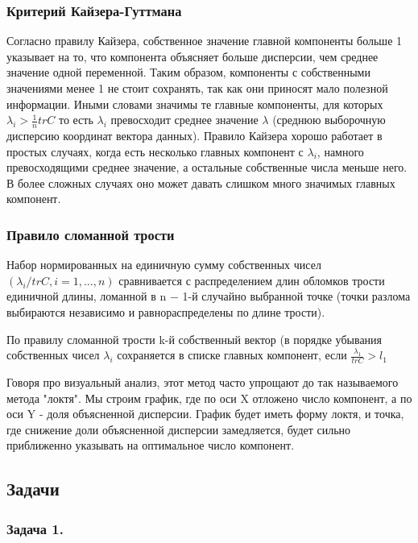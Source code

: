 \subsubsection{Критерий Кайзера-Гуттмана}
Согласно правилу Кайзера, собственное значение главной компоненты больше 1 указывает на то, что компонента объясняет больше дисперсии, чем среднее значение одной переменной. Таким образом, компоненты с собственными значениями менее 1 не стоит сохранять, так как они приносят мало полезной информации. Иными словами значимы те главные компоненты, для которых $\displaystyle \lambda _{i}>\frac {1}{n} tr C$ то есть 
$\displaystyle \lambda _{i}$ превосходит среднее значение 
$ \displaystyle \lambda$ (среднюю выборочную дисперсию координат вектора данных). Правило Кайзера хорошо работает в простых случаях, когда есть несколько главных компонент с 
$\displaystyle \lambda _{i}$, намного превосходящими среднее значение, а остальные собственные числа меньше него. В более сложных случаях оно может давать слишком много значимых главных компонент. 

\subsubsection{Правило сломанной трости}
Набор нормированных на единичную сумму собственных чисел $(\displaystyle \lambda _{i}/ tr C, i = 1, ... ,n)$ сравнивается с распределением длин обломков трости единичной длины, ломанной в n − 1-й случайно выбранной точке (точки разлома выбираются независимо и равнораспределены по длине трости).

По правилу сломанной трости k-й собственный вектор (в порядке убывания собственных чисел $\lambda _{i}$ сохраняется в списке главных компонент, если $\frac {\lambda _{1}}{tr C} >l_{1}$

Говоря про визуальный анализ, этот метод часто упрощают до так называемого метода "локтя". Мы строим график, где по оси X отложено число компонент, а по оси Y - доля объясненной дисперсии. График будет иметь форму локтя, и точка, где снижение доли объясненной дисперсии замедляется, будет сильно приближенно указывать на оптимальное число компонент.

\subsection{Задачи}
\subsubsection*{Задача 1.}

